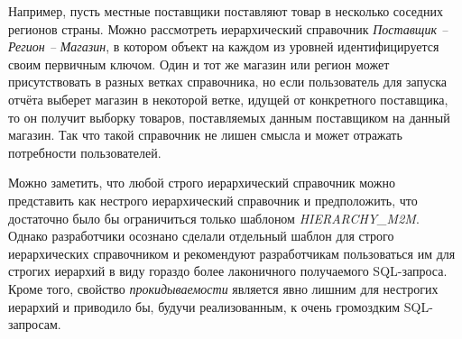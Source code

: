 \documentclass[../user-manual.tex]{subfiles}
\begin{document}
\begin{concept}
		Например, пусть местные поставщики поставляют товар в несколько соседних регионов страны. Можно рассмотреть иерархический справочник \textit{Поставщик -- Регион -- Магазин}, в котором объект на каждом из уровней идентифицируется своим первичным ключом. Один и тот же магазин или регион может присутствовать в разных ветках справочника, но если пользователь для запуска отчёта выберет магазин в некоторой ветке, идущей от конкретного поставщика, то он получит выборку товаров, поставляемых данным поставщиком на данный магазин. Так что такой справочник не лишен смысла и может отражать потребности пользователей.
		
		Можно заметить, что любой строго иерархический справочник можно представить как нестрого иерархический справочник и предположить, что достаточно было бы ограничиться только шаблоном \textit{HIERARCHY\_M2M}. Однако разработчики осознано сделали отдельный шаблон для строго иерархических справочником и рекомендуют разработчикам пользоваться им для строгих иерархий в виду гораздо более лаконичного получаемого SQL-запроса. Кроме того, свойство \textit{прокидываемости} является явно лишним для нестрогих иерархий и приводило бы, будучи реализованным, к очень громоздким SQL-запросам.
	\end{concept}
\end{document}
